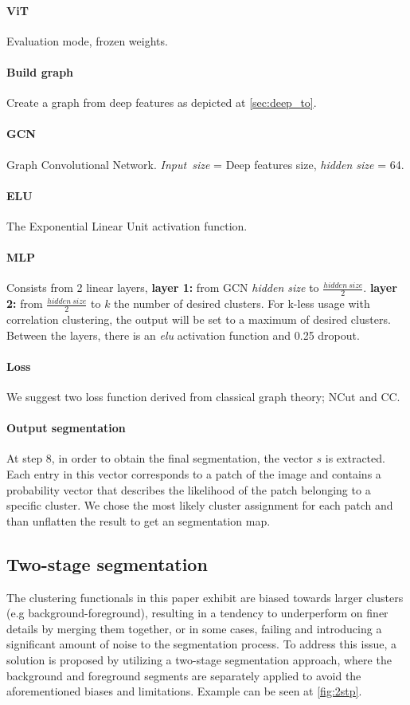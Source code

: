 \documentclass[10pt,twocolumn,letterpaper]{article}
\begin{document}
\paragraph{ViT} Evaluation mode, frozen weights.

\paragraph{Build graph} Create a graph from deep features as depicted at \cref{sec:deep_to}.

\paragraph{GCN} Graph Convolutional Network\cite{kipf2016semi}. \emph{Input\ size} = Deep features size, \emph{hidden size} = 64.

\paragraph{ELU} The Exponential Linear Unit activation function.
\paragraph{MLP} Consists from 2 linear layers, \textbf{layer 1:} from GCN \emph{hidden size} to $\frac{hidden\ size}{2}$. \textbf{layer 2:} from $\frac{hidden\ size}{2}$ to $k$ the number of desired clusters. For k-less usage with correlation clustering, the output will be set to a maximum of desired clusters. Between the layers, there is an \emph{elu} activation function and 0.25 dropout.

 \paragraph{Loss} We suggest two loss function derived from classical graph theory; NCut and CC.

\paragraph{Output segmentation} At step 8, in order to obtain the final segmentation, the vector $s$ is extracted. Each entry in this vector corresponds to a patch of the image and contains a probability vector that describes the likelihood of the patch belonging to a specific cluster. We chose the most likely cluster assignment for each patch and than unflatten the result to get an segmentation map. 

\subsection{Two-stage segmentation}
The clustering functionals in this paper exhibit are biased towards larger clusters (e.g background-foreground), resulting in a tendency to underperform on finer details by merging them together, or in some cases, failing and introducing a significant amount of noise to the segmentation process. To address this issue, a solution is proposed by utilizing a two-stage segmentation approach, where the background and foreground segments are separately applied to avoid the aforementioned biases and limitations. Example can be seen at \cref{fig:2stp}.
\end{document}
